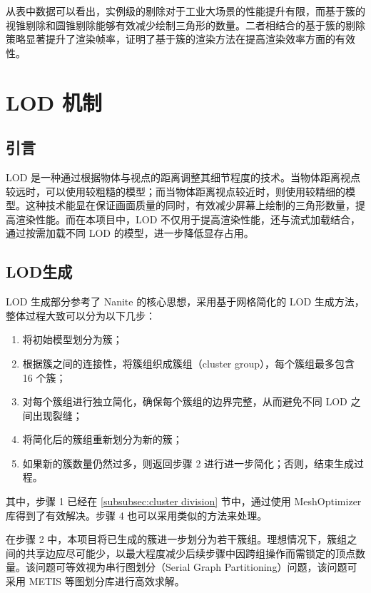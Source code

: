 从表中数据可以看出，实例级的剔除对于工业大场景的性能提升有限，而基于簇的视锥剔除和圆锥剔除能够有效减少绘制三角形的数量。二者相结合的基于簇的剔除策略显著提升了渲染帧率，证明了基于簇的渲染方法在提高渲染效率方面的有效性。

\section{LOD 机制}

\subsection{引言}

LOD 是一种通过根据物体与视点的距离调整其细节程度的技术。当物体距离视点较远时，可以使用较粗糙的模型；而当物体距离视点较近时，则使用较精细的模型。这种技术能显在保证画面质量的同时，有效减少屏幕上绘制的三角形数量，提高渲染性能\cite{Deng2017}。而在本项目中，LOD 不仅用于提高渲染性能，还与流式加载结合，通过按需加载不同 LOD 的模型，进一步降低显存占用。

\subsection{LOD生成} \label{subsec:LOD generation}

LOD 生成部分参考了 Nanite 的核心思想，采用基于网格简化的 LOD 生成方法\cite{Jensen2023}，整体过程大致可以分为以下几步\cite{Xavier2024}：

\newcommand{\stepref}[1]{\textbf{Step~\ref{#1}}}

\begin{enumerate}
    \item 将初始模型划分为簇；
    \item 根据簇之间的连接性，将簇组织成簇组（cluster group），每个簇组最多包含 16 个簇；
    \item 对每个簇组进行独立简化，确保每个簇组的边界完整，从而避免不同 LOD 之间出现裂缝；
    \item 将简化后的簇组重新划分为新的簇；
    \item 如果新的簇数量仍然过多，则返回步骤 2 进行进一步简化；否则，结束生成过程。
\end{enumerate}

其中，步骤 1 已经在 \ref{subsubsec:cluster division} 节中，通过使用 MeshOptimizer 库得到了有效解决。步骤 4 也可以采用类似的方法来处理。

在步骤 2 中，本项目将已生成的簇进一步划分为若干簇组。理想情况下，簇组之间的共享边应尽可能少，以最大程度减少后续步骤中因跨组操作而需锁定的顶点数量。该问题可等效视为串行图划分（Serial Graph Partitioning）问题，该问题可采用 METIS 等图划分库进行高效求解\cite{METIS}。


